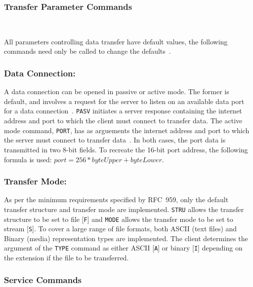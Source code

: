 \documentclass[10pt,twocolumn]{witseiepaper}
\begin{document}
\vspace*{-2mm}
\subsubsection{Transfer Parameter Commands} $   $

All parameters controlling data transfer have default values, the following commands need only be called to change the defaults~\cite{rfc959}. 

\vspace*{-2mm}
\subsubsection*{Data Connection:} A data connection can be opened in passive or active mode. The former is default, and involves a request for the server to listen on an available data port for a data connection~\cite{rfc959}. \texttt{PASV} initiates a server response containing the internet address and port to which the client must connect to transfer data. The active mode command, \texttt{PORT}, has as arguements the internet address and port to which the server must connect to transfer data~\cite{rfc959}. In both cases, the port data is transmitted in two 8-bit fields. To recreate the 16-bit port address, the following formula is used: $port = 256*byteUpper + byteLower$.

\vspace*{-2mm}
\subsubsection*{Transfer Mode:} 
As per the minimum requirements specified by RFC~959, only the default transfer structure and transfer mode are implemented. \texttt{STRU} allows the transfer structure to be set to file [\texttt{F}] and \texttt{MODE} allows the transfer mode to be set to stream [\texttt{S}]. To cover a large range of file formats, both ASCII (text files) and Binary (media) representation types are implemented. The client determines the argument of the \texttt{TYPE} command as either ASCII [\texttt{A}] or binary [\texttt{I}] depending on the extension if the file to be transferred.

\vspace*{-2mm}
\subsubsection{Service Commands} $    $

\vspace*{-2mm}
\end{document}
